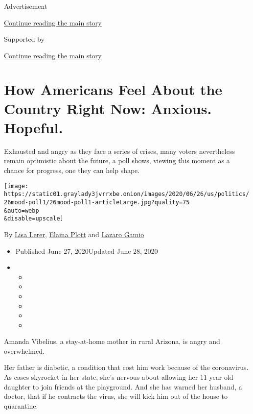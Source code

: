 Advertisement

\protect\hyperlink{after-top}{Continue reading the main story}

Supported by

\protect\hyperlink{after-sponsor}{Continue reading the main story}

\hypertarget{how-americans-feel-about-the-country-right-now-anxious-hopeful}{%
\section{How Americans Feel About the Country Right Now: Anxious.
Hopeful.}\label{how-americans-feel-about-the-country-right-now-anxious-hopeful}}

Exhausted and angry as they face a series of crises, many voters
nevertheless remain optimistic about the future, a poll shows, viewing
this moment as a chance for progress, one they can help shape.

\texttt{[image: https://static01.graylady3jvrrxbe.onion/images/2020/06/26/us/politics/26mood-poll1/26mood-poll1-articleLarge.jpg?quality=75\\\&auto=webp\\\&disable=upscale]}

By \href{https://www.nytimes3xbfgragh.onion/by/lisa-lerer}{Lisa Lerer},
\href{https://www.nytimes3xbfgragh.onion/by/elaina-plott}{Elaina Plott}
and \href{https://www.nytimes3xbfgragh.onion/by/lazaro-gamio}{Lazaro
Gamio}

\begin{itemize}
\item
  Published June 27, 2020Updated June 28, 2020
\item
  \begin{itemize}
  \item
  \item
  \item
  \item
  \item
  \item
  \end{itemize}
\end{itemize}

Amanda Vibelius, a stay-at-home mother in rural Arizona, is angry and
overwhelmed.

​Her father is diabetic, a condition that cost him work because of the
coronavirus. As cases skyrocket in her state, she's nervous about
allowing her 11-year-old daughter to join friends at the playground. And
she has warned her husband, a doctor, that if he contracts the virus,
she will kick him out of the house to quarantine.

